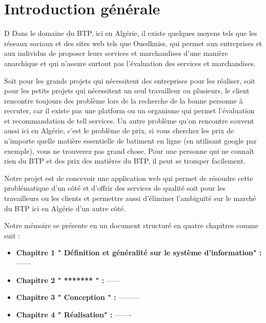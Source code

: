 \chapter*{Introduction générale}
D
Dans le domaine du BTP, ici en Algérie, il existe quelques moyens tels que les réseaux sociaux et des sites web tels que Ouedkniss, qui permet aux entreprises et aux individus de proposer leurs services et marchandises d’une manière anarchique et qui n’assure surtout pas l'évaluation des services et marchandises.
\\

\par Soit pour les grands projets qui nécessitent des entreprises pour les réaliser, soit pour les petits projets qui nécessitent un seul travailleur ou plusieurs, le client rencontre toujours des problème lors de la recherche de la bonne personne à recruter, car il existe pas une platform ou un organisme qui permet l’évaluation et recommandation de tell services. Un autre problème qu’on rencontre souvent aussi ici en Algérie, c’est le problème de prix, si vous cherchez les prix de n'importe quelle matière essentielle de batiment en ligne (en utilisant google par exemple), vous ne trouverez pas grand chose. Pour une personne qui ne connaît rien du BTP et des prix des matières du BTP, il peut se tromper facilement.\\

\par Notre projet est de concevoir une application web qui permet de résoudre cette problématique d’un côté et d'offrir des services de qualité soit pour les travailleurs ou les clients et permettre aussi d'éliminer l'ambiguïté sur le marché du BTP  ici en Algérie d’un autre côté.\\
\newpage
\vspace{0.5cm}
\par Notre mémoire se présente en un document structuré en quatre chapitres comme suit : 

\begin{itemize}[label=\textbullet]
\item \textbf{Chapitre 1 " Définition et généralité sur le système d'information" : } ------ \\

\item \textbf{Chapitre 2 " ******* " : } ------\\

\item \textbf{Chapitre 3 " Conception " :} ---------\\  

\item \textbf{Chapitre 4 " Réalisation" : }-------
\end{itemize}

